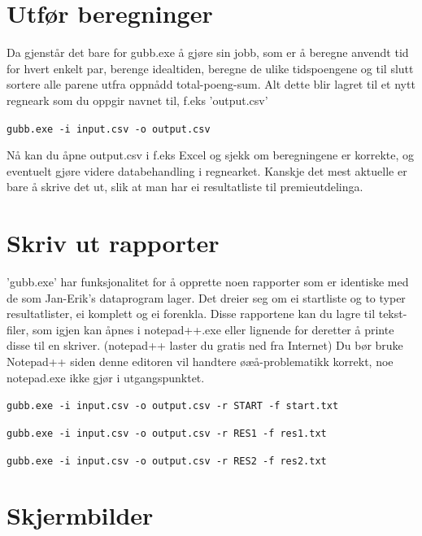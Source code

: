 \documentclass[12pt]{book}
\begin{document}
\newpage

\section{Utfør beregninger}

Da gjenstår det bare for gubb.exe å gjøre sin jobb, som er å beregne anvendt tid for hvert enkelt par, berenge idealtiden, beregne de ulike tidspoengene og til slutt sortere alle parene utfra oppnådd total-poeng-sum. Alt dette blir lagret til et nytt regneark som du oppgir navnet til, f.eks 'output.csv'

\begin{alltt}
\texttt{gubb.exe -i input.csv -o output.csv  {\Return} }
\end{alltt}

Nå kan du åpne output.csv i f.eks Excel og sjekk om beregningene er korrekte, og eventuelt gjøre videre databehandling i regnearket. Kanskje det mest aktuelle er bare å skrive det ut, slik at man har ei resultatliste til premieutdelinga.

\section{Skriv ut rapporter}

'gubb.exe' har funksjonalitet for å opprette noen rapporter som er identiske med de som Jan-Erik's dataprogram lager. Det dreier seg om ei startliste og to typer resultatlister, ei komplett og ei forenkla. Disse rapportene kan du lagre til tekst-filer, som igjen kan åpnes i notepad++.exe eller lignende for deretter å printe disse til en skriver. (notepad++ laster du gratis ned fra Internet) Du bør bruke Notepad++ siden denne editoren vil handtere øæå-problematikk korrekt, noe notepad.exe ikke gjør i utgangspunktet.


\begin{alltt}
\texttt{gubb.exe -i input.csv -o output.csv -r START -f start.txt  {\Return} }

\texttt{gubb.exe -i input.csv -o output.csv -r RES1 -f res1.txt  {\Return} }

\texttt{gubb.exe -i input.csv -o output.csv -r RES2 -f res2.txt  {\Return} }
\end{alltt}

\newpage
\section{Skjermbilder}
\end{document}
